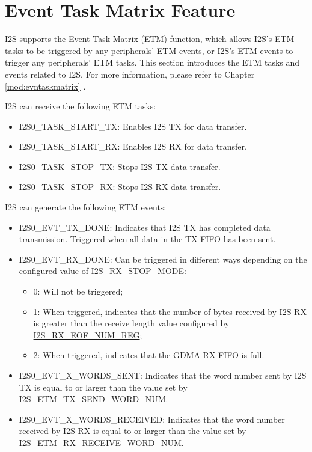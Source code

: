 \documentclass[main\_\_EN.tex]{subfiles}
\begin{document}
\section{Event Task Matrix Feature}\label{sec:i2s-etm-func}

\chipname{} I2S supports the Event Task Matrix (ETM) function, which allows I2S's ETM tasks to be triggered by any peripherals' ETM events, or I2S's ETM events to trigger any peripherals' ETM tasks. This section introduces the ETM tasks and events related to I2S. For more information, please refer to Chapter \ref{mod:evntaskmatrix} .

I2S can receive the following ETM tasks:

\begin{itemize}
    \item \label{task:I2STASKSTARTTX}I2S0\_TASK\_START\_TX: Enables I2S TX for data transfer.
    \item \label{task:I2STASKSTARTRX}I2S0\_TASK\_START\_RX: Enables I2S RX for data transfer.
    \item \label{task:I2STASKSTOPTX}I2S0\_TASK\_STOP\_TX: Stops I2S TX data transfer.
    \item \label{task:I2STASKSTOPRX}I2S0\_TASK\_STOP\_RX: Stops I2S RX data transfer.
\end{itemize}

I2S can generate the following ETM events:

\begin{itemize}
    \item \label{evt:I2SEVTTXDONE}I2S0\_EVT\_TX\_DONE: Indicates that I2S TX has completed data transmission. Triggered when all data in the TX FIFO has been sent.
    \item \label{evt:I2SEVTRXDONE}I2S0\_EVT\_RX\_DONE: Can be triggered in different ways depending on the configured value of \hyperref[fielddesc:I2SRXSTOPMODE]{I2S\_RX\_STOP\_MODE}:
    \begin{itemize}
        \item 0: Will not be triggered;
        \item 1: When triggered, indicates that the number of bytes received by I2S RX is greater than the receive length value configured by \hyperref[regdesc:I2SRXEOFNUMREG]{I2S\_RX\_EOF\_NUM\_REG};
        \item 2: When triggered, indicates that the GDMA RX FIFO is full.
    \end{itemize}
    \item \label{evt:I2SEVTXWORDSSENT}I2S0\_EVT\_X\_WORDS\_SENT: Indicates that the word number sent by I2S TX is equal to or larger than the value set by \hyperref[fielddesc:I2SETMTXSENDWORDNUM]{I2S\_ETM\_TX\_SEND\_WORD\_NUM}.
    \item \label{evt:I2SEVTXWORDSRECEIVED}I2S0\_EVT\_X\_WORDS\_RECEIVED: Indicates that the word number received by I2S RX is equal to or larger than the value set by \hyperref[fielddesc:I2SETMRXRECEIVEWORDNUM]{I2S\_ETM\_RX\_RECEIVE\_WORD\_NUM}.
\end{itemize}
\end{document}

